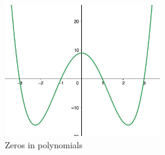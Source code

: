 \documentclass{article}
\begin{document}
\begin{figure}
    \centering
    \includegraphics[width=0.6\textwidth]{zeros.png}
    \caption{Zeros in polynomials}
    \label{fig:Zeros}
\end{figure}
\end{document}
